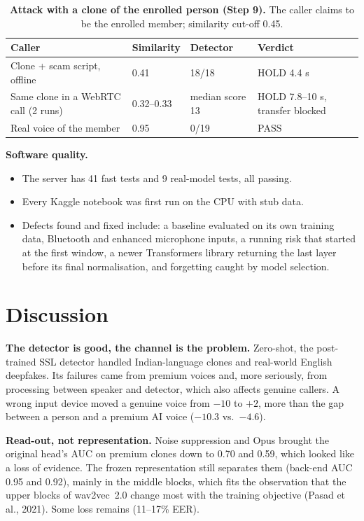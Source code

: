\documentclass[10pt,a4paper,twocolumn]{article}
\begin{document}
\begin{table}[t]
\centering\scriptsize
\caption{\textbf{Attack with a clone of the enrolled person (Step 9).} The caller claims to be the enrolled member; similarity cut-off 0.45.}
\label{tab:attack}
\setlength{\tabcolsep}{3pt}
\begin{tabular}{@{}p{}p{}p{}p{}@{}}
\toprule
\textbf{Caller} & \textbf{Similarity} & \textbf{Detector} & \textbf{Verdict}\\
\midrule
Clone + scam script, offline & 0.41 & 18/18 & HOLD 4.4 s\\
Same clone in a WebRTC call (2 runs) & 0.32--0.33 & median score 13 & HOLD 7.8--10 s, transfer blocked\\
Real voice of the member & 0.95 & 0/19 & PASS\\
\bottomrule
\end{tabular}
\end{table}

\textbf{Software quality.}
\begin{itemize}\setlength\itemsep{0pt}
\item The server has 41 fast tests and 9 real-model tests, all passing.
\item Every Kaggle notebook was first run on the CPU with stub data.
\item Defects found and fixed include: a baseline evaluated on its own training data, Bluetooth and enhanced microphone inputs, a running risk that started at the first window, a newer Transformers library returning the last layer before its final normalisation, and forgetting caught by model selection.
\end{itemize}

\section{Discussion}
\textbf{The detector is good, the channel is the problem.} Zero-shot, the post-trained SSL detector handled Indian-language clones and real-world English deepfakes. Its failures came from premium voices and, more seriously, from processing between speaker and detector, which also affects genuine callers. A wrong input device moved a genuine voice from $-10$ to $+2$, more than the gap between a person and a premium AI voice ($-10.3$ vs.\ $-4.6$).

\textbf{Read-out, not representation.} Noise suppression and Opus brought the original head's AUC on premium clones down to 0.70 and 0.59, which looked like a loss of evidence. The frozen representation still separates them (back-end AUC 0.95 and 0.92), mainly in the middle blocks, which fits the observation that the upper blocks of wav2vec~2.0 change most with the training objective (Pasad et al., 2021). Some loss remains (11--17\% EER).
\end{document}
